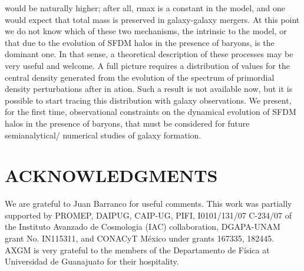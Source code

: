 \documentclass[9.5pt, twocolumn]{article}
\begin{document}
would be naturally higher; after all, rmax is a constant
in the model, and one would expect that total mass is
preserved in galaxy-galaxy mergers. At this point we do
not know which of these two mechanisms, the intrinsic to
the model, or that due to the evolution of SFDM halos
in the presence of baryons, is the dominant one. In that
sense, a theoretical description of these processes may be
very useful and welcome.
A full picture requires a distribution of values for the
central density generated from the evolution of the spectrum
of primordial density perturbations after in
ation.
Such a result is not available now, but it is possible to
start tracing this distribution with galaxy observations.
We present, for the first time, observational constraints
on the dynamical evolution of SFDM halos in the presence
of baryons, that must be considered for future semianalytical/
numerical studies of galaxy formation.\\


\section{\centering \little ACKNOWLEDGMENTS}
We are grateful to Juan Barranco for useful comments.
This work was partially supported by PROMEP, DAIPUG,
CAIP-UG, PIFI, I0101/131/07 C-234/07 of the Instituto
Avanzado de Cosmologia (IAC) collaboration,
DGAPA-UNAM grant No. IN115311, and CONACyT
México under grants 167335, 182445. AXGM is very
grateful to the members of the Departamento de Física
at Universidad de Guanajuato for their hospitality.

\newpage


\end{document}
